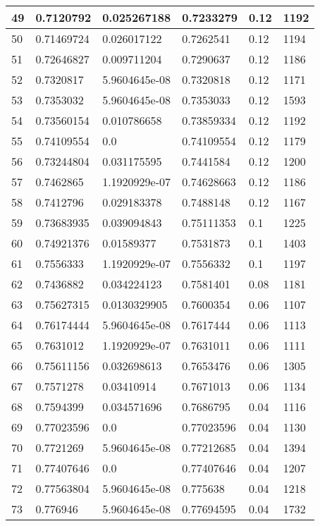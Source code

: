 \begin{longtable}{|l|l|l|l|l|l|}
49 & 0.7120792 & 0.025267188 & 0.7233279 & 0.12 & 1192 \\ \hline 
50 & 0.71469724 & 0.026017122 & 0.7262541 & 0.12 & 1194 \\ \hline 
51 & 0.72646827 & 0.009711204 & 0.7290637 & 0.12 & 1186 \\ \hline 
52 & 0.7320817 & 5.9604645e-08 & 0.7320818 & 0.12 & 1171 \\ \hline 
53 & 0.7353032 & 5.9604645e-08 & 0.7353033 & 0.12 & 1593 \\ \hline 
54 & 0.73560154 & 0.010786658 & 0.73859334 & 0.12 & 1192 \\ \hline 
55 & 0.74109554 & 0.0 & 0.74109554 & 0.12 & 1179 \\ \hline 
56 & 0.73244804 & 0.031175595 & 0.7441584 & 0.12 & 1200 \\ \hline 
57 & 0.7462865 & 1.1920929e-07 & 0.74628663 & 0.12 & 1186 \\ \hline 
58 & 0.7412796 & 0.029183378 & 0.7488148 & 0.12 & 1167 \\ \hline 
59 & 0.73683935 & 0.039094843 & 0.75111353 & 0.1 & 1225 \\ \hline 
60 & 0.74921376 & 0.01589377 & 0.7531873 & 0.1 & 1403 \\ \hline 
61 & 0.7556333 & 1.1920929e-07 & 0.7556332 & 0.1 & 1197 \\ \hline 
62 & 0.7436882 & 0.034224123 & 0.7581401 & 0.08 & 1181 \\ \hline 
63 & 0.75627315 & 0.0130329905 & 0.7600354 & 0.06 & 1107 \\ \hline 
64 & 0.76174444 & 5.9604645e-08 & 0.7617444 & 0.06 & 1113 \\ \hline 
65 & 0.7631012 & 1.1920929e-07 & 0.7631011 & 0.06 & 1111 \\ \hline 
66 & 0.75611156 & 0.032698613 & 0.7653476 & 0.06 & 1305 \\ \hline 
67 & 0.7571278 & 0.03410914 & 0.7671013 & 0.06 & 1134 \\ \hline 
68 & 0.7594399 & 0.034571696 & 0.7686795 & 0.04 & 1116 \\ \hline 
69 & 0.77023596 & 0.0 & 0.77023596 & 0.04 & 1130 \\ \hline 
70 & 0.7721269 & 5.9604645e-08 & 0.77212685 & 0.04 & 1394 \\ \hline 
71 & 0.77407646 & 0.0 & 0.77407646 & 0.04 & 1207 \\ \hline 
72 & 0.77563804 & 5.9604645e-08 & 0.775638 & 0.04 & 1218 \\ \hline 
73 & 0.776946 & 5.9604645e-08 & 0.77694595 & 0.04 & 1732 \\ \hline 

\end{longtable}
